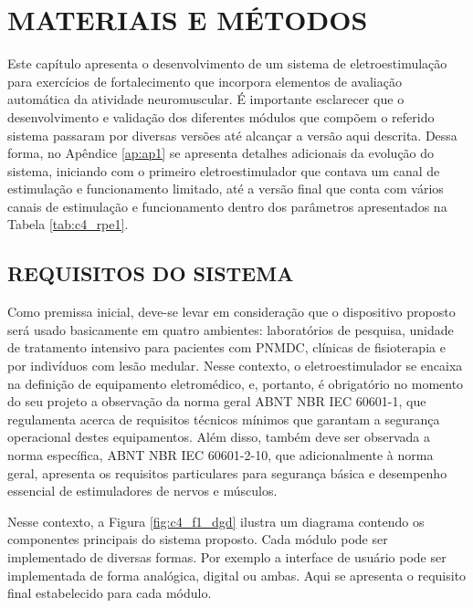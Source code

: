 \chapter{MATERIAIS E MÉTODOS}
\label{sec:cap4}

\vspace{1cm}

Este capítulo apresenta o desenvolvimento de um sistema de eletroestimulação para exercícios de fortalecimento que incorpora elementos de avaliação automática da atividade neuromuscular. É importante esclarecer que o desenvolvimento e validação dos diferentes módulos que compõem o referido sistema passaram por diversas versões até alcançar a versão aqui descrita. Dessa forma, no Apêndice \ref{ap:ap1} se apresenta detalhes adicionais da evolução do sistema, iniciando com o primeiro eletroestimulador que contava um canal de estimulação e funcionamento limitado, até a versão final que conta com vários canais de estimulação e funcionamento dentro dos parâmetros apresentados na Tabela \ref{tab:c4_rpe1}.


\section{REQUISITOS DO SISTEMA} \label{cap:4_s1}
Como premissa inicial, deve-se levar em consideração que o dispositivo proposto será usado basicamente em quatro ambientes: laboratórios de pesquisa, unidade de tratamento intensivo para pacientes com \acrshort{PNMDC}, clínicas de fisioterapia e por indivíduos com lesão medular. Nesse contexto, o eletroestimulador se encaixa na definição de equipamento eletromédico, e, portanto, é obrigatório no momento do seu projeto a observação da norma geral \acrshort{ABNT} \acrshort{NBR} \acrshort{IEC} 60601-1, que regulamenta acerca de requisitos técnicos mínimos que garantam a segurança operacional destes equipamentos. Além disso, também deve ser observada a norma específica, \acrshort{ABNT} \acrshort{NBR} \acrshort{IEC} 60601-2-10, que adicionalmente à norma geral, apresenta os requisitos particulares para segurança básica e desempenho essencial de estimuladores de nervos e músculos.

Nesse contexto, a Figura \ref{fig:c4_f1_dgd} ilustra um diagrama contendo os componentes principais do sistema proposto. Cada módulo pode ser implementado de diversas formas. Por exemplo a interface de usuário pode ser implementada de forma analógica, digital ou ambas. Aqui se apresenta o requisito final estabelecido para cada módulo. 

